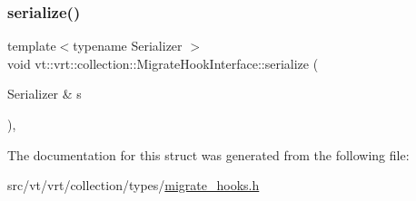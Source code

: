 \subsubsection{\texorpdfstring{serialize()}{serialize()}}
{\footnotesize\ttfamily template$<$typename Serializer $>$ \\
void vt\+::vrt\+::collection\+::\+Migrate\+Hook\+Interface\+::serialize (\begin{DoxyParamCaption}\item[{Serializer \&}]{s }\end{DoxyParamCaption})\hspace{0.3cm}{\ttfamily [inline]}, {\ttfamily [protected]}}



The documentation for this struct was generated from the following file\+:\begin{DoxyCompactItemize}
\item 
src/vt/vrt/collection/types/\hyperlink{migrate__hooks_8h}{migrate\+\_\+hooks.\+h}\end{DoxyCompactItemize}
